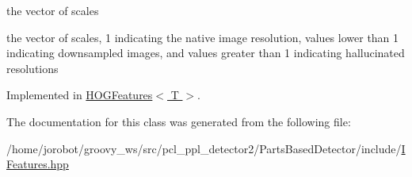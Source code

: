 the vector of scales 

the vector of scales, 1 indicating the native image resolution, values lower than 1 indicating downsampled images, and values greater than 1 indicating hallucinated resolutions 

\-Implemented in \hyperlink{classHOGFeatures_ad9668fda860881c676e1d1bd70adc18c}{\-H\-O\-G\-Features$<$ T $>$}.



\-The documentation for this class was generated from the following file\-:\begin{DoxyCompactItemize}
\item 
/home/jorobot/groovy\-\_\-ws/src/pcl\-\_\-ppl\-\_\-detector2/\-Parts\-Based\-Detector/include/\hyperlink{IFeatures_8hpp}{\-I\-Features.\-hpp}\end{DoxyCompactItemize}
